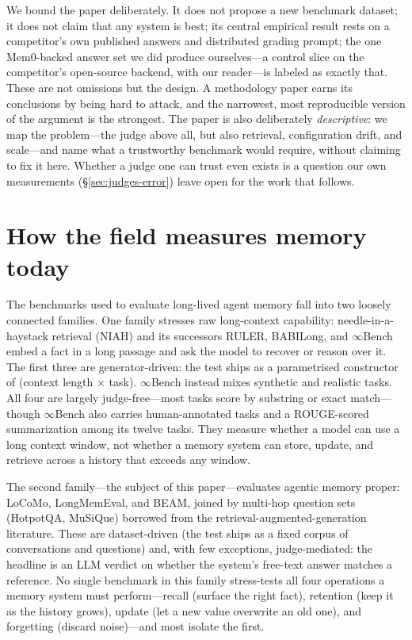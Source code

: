 \documentclass[11pt]{article}
\begin{document}
We bound the paper deliberately. It does not propose a new benchmark dataset; it does not claim that any system is best; its central empirical result rests on a competitor's own published answers and distributed grading prompt; the one Mem0-backed answer set we did produce ourselves---a control slice on the competitor's open-source backend, with our reader---is labeled as exactly that. These are not omissions but the design. A methodology paper earns its conclusions by being hard to attack, and the narrowest, most reproducible version of the argument is the strongest. The paper is also deliberately \emph{descriptive}: we map the problem---the judge above all, but also retrieval, configuration drift, and scale---and name what a trustworthy benchmark would require, without claiming to fix it here. Whether a judge one can trust even exists is a question our own measurements (\S\ref{sec:judges-error}) leave open for the work that follows.

\section{How the field measures memory today}\label{sec:survey}

The benchmarks used to evaluate long-lived agent memory fall into two loosely connected families. One family stresses raw long-context capability: needle-in-a-haystack retrieval (NIAH)\citep{niah} and its successors RULER\citep{ruler}, BABILong\citep{babilong}, and $\infty$Bench\citep{infinitebench} embed a fact in a long passage and ask the model to recover or reason over it. The first three are generator-driven: the test ships as a parametrised constructor of (context length $\times$ task). $\infty$Bench instead mixes synthetic and realistic tasks. All four are largely judge-free---most tasks score by substring or exact match---though $\infty$Bench also carries human-annotated tasks and a ROUGE-scored summarization among its twelve tasks. They measure whether a model can use a long context window, not whether a memory system can store, update, and retrieve across a history that exceeds any window.

The second family---the subject of this paper---evaluates agentic memory proper: LoCoMo, LongMemEval\citep{longmemeval}, and BEAM\citep{beam}, joined by multi-hop question sets (HotpotQA\citep{hotpotqa}, MuSiQue\citep{musique}) borrowed from the retrieval-augmented-generation literature. These are dataset-driven (the test ships as a fixed corpus of conversations and questions) and, with few exceptions, judge-mediated: the headline is an LLM verdict on whether the system's free-text answer matches a reference. No single benchmark in this family stress-tests all four operations a memory system must perform---recall (surface the right fact), retention (keep it as the history grows), update (let a new value overwrite an old one), and forgetting (discard noise)---and most isolate the first.
\end{document}
